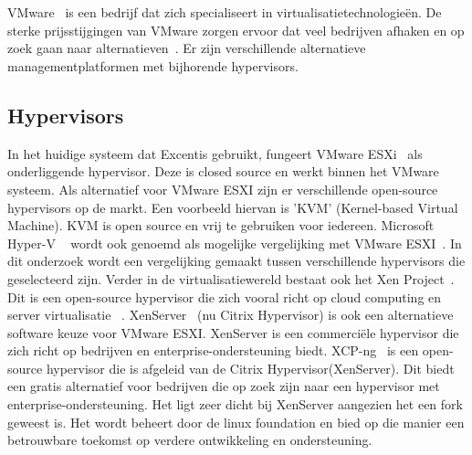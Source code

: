 
\chapter{}%
\label{ch:stand-van-zaken}


VMware~\autocite{vmware} is een bedrijf dat zich specialiseert in virtualisatietechnologieën. De sterke prijsstijgingen van VMware zorgen ervoor dat veel bedrijven afhaken en op zoek gaan naar alternatieven~\autocite{Hale2024}. Er zijn verschillende alternatieve managementplatformen met bijhorende hypervisors.

\section{Hypervisors}
In het huidige systeem dat Excentis gebruikt, fungeert VMware ESXi~\autocite{vmware} als onderliggende hypervisor. Deze is closed source en werkt binnen het VMware systeem. Als alternatief voor VMware ESXI zijn er verschillende open-source hypervisors op de markt.
Een voorbeeld hiervan is 'KVM' (Kernel-based Virtual Machine)\autocite{KVM}. KVM is open source en vrij te gebruiken voor iedereen\autocite{KVM}. Microsoft Hyper-V ~\autocite{Eaton2019} wordt ook genoemd als mogelijke vergelijking met VMware ESXI~\autocite{fayyad2013benchmarking}. In dit onderzoek wordt een vergelijking gemaakt tussen verschillende hypervisors die geselecteerd zijn.
Verder in de virtualisatiewereld bestaat ook het Xen Project~\autocite{xenproject}. Dit is een open-source hypervisor die zich vooral richt op cloud computing en server virtualisatie ~\autocite{binu2011virtualization}.
XenServer~\autocite{xenserverwebsite} (nu Citrix Hypervisor) is ook een alternatieve software keuze voor VMware ESXI. XenServer is een commerciële hypervisor die zich richt op bedrijven en enterprise-ondersteuning biedt.
XCP-ng~\autocite{el2021server} is een open-source hypervisor die is afgeleid van de Citrix Hypervisor(XenServer). Dit biedt een gratis alternatief voor bedrijven die op zoek zijn naar een hypervisor met enterprise-ondersteuning.
Het ligt zeer dicht bij XenServer aangezien het een fork geweest is. Het wordt beheert door de linux foundation en bied op die manier een betrouwbare toekomst op verdere ontwikkeling en ondersteuning.

